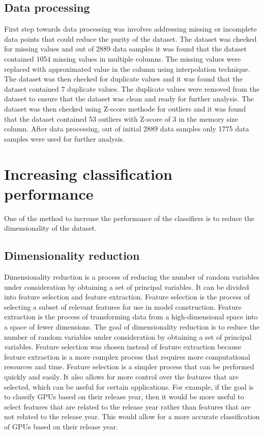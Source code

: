 \documentclass[conference,onecolumn]{IEEEtran}
\begin{document}

\subsection{Data processing}
    First step towards data processing was involves addressing missing or incomplete data points that could reduce the purity of the dataset. The dataset was checked for missing values and out of 2889 data samples it was found that the dataset contained 1054 missing values in multiple columns. The missing values were replaced with approximated value in the column using interpolation technique. The dataset was then checked for duplicate values and it was found that the dataset contained 7 duplicate values. The duplicate values were removed from the dataset to ensure that the dataset was clean and ready for further analysis. The dataset was then checked using Z-score methode for outliers and it was found that the dataset contained 53 outliers with Z-score of 3 in the memory size column.
    After data processing, out of initial 2889 data samples only 1775 data samples were used for further analysis.


\section{Increasing classification performance}
    One of the method to increase the performance of the classifiers is to reduce the dimensionality of the dataset.
    \subsection{Dimensionality reduction}
        Dimensionality reduction is a process of reducing the number of random variables under consideration by obtaining a set of principal variables. It can be divided into feature selection and feature extraction. Feature selection is the process of selecting a subset of relevant features for use in model construction. Feature extraction is the process of transforming data from a high-dimensional space into a space of fewer dimensions. The goal of dimensionality reduction is to reduce the number of random variables under consideration by obtaining a set of principal variables.
        Feature selection was chosen instead of feature extraction because feature extraction is a more complex process that requires more computational resources and time. Feature selection is a simpler process that can be performed quickly and easily. It also allows for more control over the features that are selected, which can be useful for certain applications. For example, if the goal is to classify GPUs based on their release year, then it would be more useful to select features that are related to the release year rather than features that are not related to the release year. This would allow for a more accurate classification of GPUs based on their release year.
\end{document}
